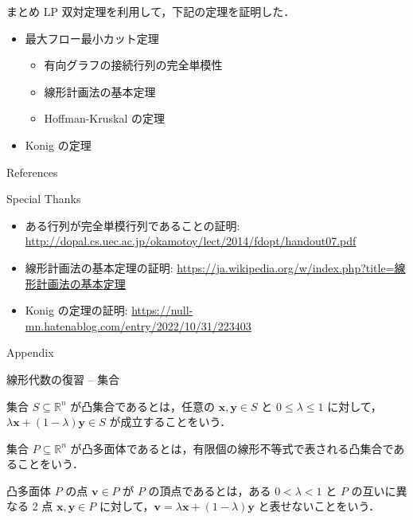 \documentclass[aspectratio=169]{beamer}
\begin{document}
\begin{frame}{まとめ}
	LP 双対定理を利用して，下記の定理を証明した．
	\begin{itemize}
		\item[\checkmark] 最大フロー最小カット定理
		      \begin{itemize}
			      \item[\checkmark] 有向グラフの接続行列の完全単模性
			      \item[\checkmark] 線形計画法の基本定理
			      \item[\checkmark] Hoffman-Kruskal の定理
		      \end{itemize}
		\item[\checkmark] Konig の定理
	\end{itemize}
\end{frame}

\begin{frame}[allowframebreaks]{References}
	\printbibliography[heading=none]{}
\end{frame}

\begin{frame}{Special Thanks}
	\begin{itemize}
		\item ある行列が完全単模行列であることの証明: \url{http://dopal.cs.uec.ac.jp/okamotoy/lect/2014/fdopt/handout07.pdf}
		\item 線形計画法の基本定理の証明: \url{https://ja.wikipedia.org/w/index.php?title=線形計画法の基本定理}
		\item Konig の定理の証明: \url{https://null-mn.hatenablog.com/entry/2022/10/31/223403}
	\end{itemize}
\end{frame}

\begin{frame}[standout]
	Appendix
\end{frame}

\appendix

\begin{frame}{線形代数の復習 -- 集合}
	\begin{definition}[凸集合]
		集合 \(S \subseteq \mathbb{R}^n\) が\alert{凸集合}であるとは，任意の \(\boldsymbol{x}, \boldsymbol{y} \in S\) と \(0 \leq \lambda \leq 1\) に対して，\(\lambda \boldsymbol{x} + (1 - \lambda) \boldsymbol{y} \in S\) が成立することをいう．
	\end{definition}

	\begin{definition}[凸多面体]
		集合 \(P \subseteq \mathbb{R}^n\) が\alert{凸多面体}であるとは，有限個の線形不等式で表される凸集合であることをいう．
	\end{definition}

	\begin{definition}[頂点]
		凸多面体 \(P\) の点 \(\boldsymbol{v} \in P\) が \(P\) の\alert{頂点}であるとは，ある \(0 < \lambda < 1\) と \(P\) の互いに異なる 2 点 \(\boldsymbol{x}, \boldsymbol{y} \in P\) に対して，\(\boldsymbol{v} = \lambda \boldsymbol{x} + (1 - \lambda) \boldsymbol{y}\) と表せないことをいう．
	\end{definition}
\end{frame}
\end{document}
